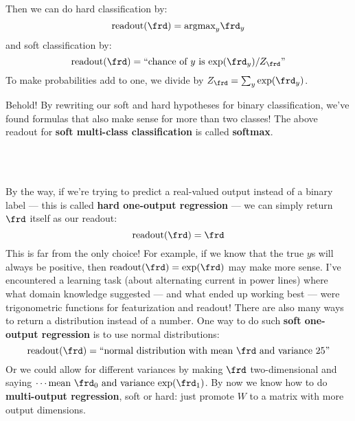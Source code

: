   Then we can do hard classification by:
  $$
    \text{readout}(\frd) = \text{argmax}_{y} \frd_y
  $$
  and soft classification by:
  $$
    \text{readout}(\frd) = \text{``chance of $y$ is $\exp(\frd_y)/Z_\frd$''}
  $$
  To make probabilities add to one, we divide by $Z_\frd = \sum_y
  \exp(\frd_y)$.

  Behold!  By rewriting our soft and hard hypotheses for binary classification,
  we've found formulas that also make sense for more than two classes!  The
  above readout for \textbf{soft multi-class classification} is called
  \textbf{softmax}.
  \begin{marginfigure}
    \\
      \vspace{4cm}\\
  \end{marginfigure}




\marginnote[-2.133cm]{\veryoptional}%
  By the way, if we're trying to predict a real-valued output instead of a
  binary label --- this is called \textbf{hard one-output regression} --- we can
  simply return $\frd$ itself as our readout:
  $$
    \text{readout}(\frd) = \frd
  $$
  This is far from the only choice!
  For example, if we know that the true
  $y$s will always be positive, then $\text{readout}(\frd) = \exp(\frd)$ may
  make more sense.
    I've encountered a learning task (about alternating current in power lines)
    where what domain knowledge suggested --- and what ended up working best ---
    were trigonometric functions for featurization and readout!
  There are also many ways to return a distribution instead of a number.  One
  way to do such \textbf{soft one-output regression} is to use normal distributions:
  $$
    \text{readout}(\frd) = \text{``normal distribution with mean $\frd$ and variance $25$''}
  $$
  Or we could allow for different variances by making $\frd$ two-dimensional
  and saying $\cdots \text{mean $\frd_0$ and variance $\exp(\frd_1)$}$.
  By now we know how to do \textbf{multi-output regression}, soft or hard: just
  promote $W$ to a matrix with more output dimensions.

